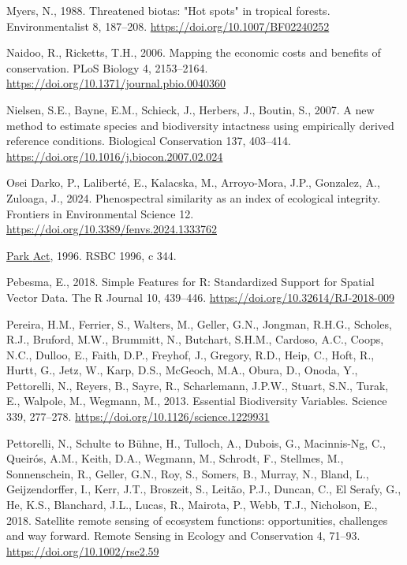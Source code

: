 \documentclass[
]{agujournal2019}
\newlength{\cslhangindent}
\newenvironment{CSLReferences}[2] %
 {\begin{list}{}{%
  \setlength{\itemindent}{0pt}
  \setlength{\leftmargin}{0pt}
  \setlength{\parsep}{0pt}
  \ifodd #1
   \setlength{\leftmargin}{\cslhangindent}
   \setlength{\itemindent}{-1\cslhangindent}
  \fi
  \setlength{\itemsep}{#2\baselineskip}}}
 {\end{list}}
\begin{document}
\begin{CSLReferences}{1}{0}
Myers, N., 1988. Threatened biotas: {"}Hot spots{"} in tropical forests.
Environmentalist 8, 187--208. \url{https://doi.org/10.1007/BF02240252}

Naidoo, R., Ricketts, T.H., 2006. Mapping the economic costs and
benefits of conservation. PLoS Biology 4, 2153--2164.
\url{https://doi.org/10.1371/journal.pbio.0040360}

Nielsen, S.E., Bayne, E.M., Schieck, J., Herbers, J., Boutin, S., 2007.
A new method to estimate species and biodiversity intactness using
empirically derived reference conditions. Biological Conservation 137,
403--414. \url{https://doi.org/10.1016/j.biocon.2007.02.024}

Osei Darko, P., Laliberté, E., Kalacska, M., Arroyo-Mora, J.P.,
Gonzalez, A., Zuloaga, J., 2024. Phenospectral similarity as an index of
ecological integrity. Frontiers in Environmental Science 12.
\url{https://doi.org/10.3389/fenvs.2024.1333762}

\href{https://www.bclaws.gov.bc.ca/civix/document/id/complete/statreg/96344_01}{Park
{Act}}, 1996. RSBC 1996, c 344.

Pebesma, E., 2018. {Simple Features for R: Standardized Support for
Spatial Vector Data}. {The R Journal} 10, 439--446.
\url{https://doi.org/10.32614/RJ-2018-009}

Pereira, H.M., Ferrier, S., Walters, M., Geller, G.N., Jongman, R.H.G.,
Scholes, R.J., Bruford, M.W., Brummitt, N., Butchart, S.H.M., Cardoso,
A.C., Coops, N.C., Dulloo, E., Faith, D.P., Freyhof, J., Gregory, R.D.,
Heip, C., Hoft, R., Hurtt, G., Jetz, W., Karp, D.S., McGeoch, M.A.,
Obura, D., Onoda, Y., Pettorelli, N., Reyers, B., Sayre, R.,
Scharlemann, J.P.W., Stuart, S.N., Turak, E., Walpole, M., Wegmann, M.,
2013. Essential Biodiversity Variables. Science 339, 277--278.
\url{https://doi.org/10.1126/science.1229931}

Pettorelli, N., Schulte to Bühne, H., Tulloch, A., Dubois, G.,
Macinnis-Ng, C., Queirós, A.M., Keith, D.A., Wegmann, M., Schrodt, F.,
Stellmes, M., Sonnenschein, R., Geller, G.N., Roy, S., Somers, B.,
Murray, N., Bland, L., Geijzendorffer, I., Kerr, J.T., Broszeit, S.,
Leitão, P.J., Duncan, C., El Serafy, G., He, K.S., Blanchard, J.L.,
Lucas, R., Mairota, P., Webb, T.J., Nicholson, E., 2018. Satellite
remote sensing of ecosystem functions: opportunities, challenges and way
forward. Remote Sensing in Ecology and Conservation 4, 71--93.
\url{https://doi.org/10.1002/rse2.59}


\end{CSLReferences}
\end{document}

